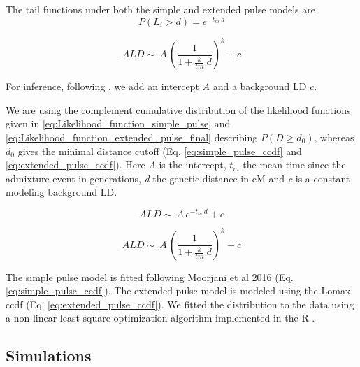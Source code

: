 \documentclass[]{article}
\begin{document}
The tail functions under both the simple and extended pulse models are 
\begin{equation}
\label{eq:simple_pulse_ccdf}
P(L_i > d) = e^{-t_m \:d}
\end{equation}

\begin{equation}
\label{eq:extended_pulse_ccdf}
ALD \sim\ A\,\left( \frac{1}{1 + \frac{k}{tm} \:d}\right) ^k+c
\end{equation}

For inference, following \cite{moorjani_history_2011}, we add an intercept $A$ and a background LD $c$.

We are using the complement cumulative distribution of the likelihood functions given in \ref{eq:Likelihood_function_simple_pulse} and \ref{eq:Likelihood_function_extended_pulse_final} describing $P(D \geq d_0)$, whereas $d_0$ gives the minimal distance cutoff (Eq. \ref{eq:simple_pulse_ccdf} and \ref{eq:extended_pulse_ccdf}). Here \emph{A} is the
intercept, $t_m$ the mean time since the admixture event in generations,
\emph{d} the genetic distance in cM and \emph{c} is a constant modeling
background LD. 


\begin{equation}
\label{eq:simple_pulse_ccdf}
ALD \sim\ A\,e^{-t_m \:d}+c
\end{equation}

\begin{equation}
\label{eq:extended_pulse_ccdf}
ALD \sim\ A\,\left( \frac{1}{1 + \frac{k}{tm} \:d}\right) ^k+c
\end{equation}

The simple pulse model is fitted following Moorjani et al 2016
\citep{moorjani_genetic_2016} (Eq. \ref{eq:simple_pulse_ccdf}). The extended pulse model is
modeled using the Lomax ccdf (Eq. \ref{eq:extended_pulse_ccdf}).  We fitted the distribution to the data using a non-linear least-square optimization algorithm
implemented in the R \citep{R_Core_Team_2019}.


\subsection{Simulations}\label{simulations}
\end{document}
